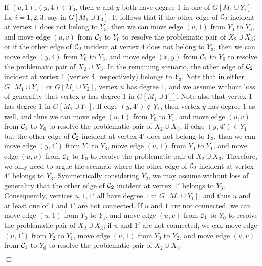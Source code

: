 \documentclass[11pt,twoside]{article}\usepackage{amssymb,latexsym,graphicx,hyperref}\usepackage{epstopdf}
\newenvironment{proof}{{\sc Proof. }}{\hfill$\Box$\vspace{0.2in}}
\begin{document}
\begin{proof}
If $(u, 1), (y, 4) \in Y_0$, then $u$ and $y$ both have degree $1$ in one of $G[M_1 \cup Y_i]$ for $i = 1, 2, 3$, say in $G[M_1 \cup Y_3]$.
It follows that if the other edge of ${\cal C}_2$ incident at vertex $1$ does not belong to $Y_3$,
then we can move edge $(u, 1)$ from $Y_0$ to $Y_3$, and move edge $(u, v)$ from ${\cal C}_1$ to $Y_0$ to resolve the problematic pair of $X_2 \cup X_3$;
or if the other edge of ${\cal C}_2$ incident at vertex $4$ does not belong to $Y_3$,
then we can move edge $(y, 4)$ from $Y_0$ to $Y_3$, and move edge $(x, y)$ from ${\cal C}_1$ to $Y_0$ to resolve the problematic pair of $X_2 \cup X_3$.
In the remaining scenario, the other edge of ${\cal C}_2$ incident at vertex $1$ (vertex $4$, respectively) belongs to $Y_3$.
Note that in either $G[M_1 \cup Y_1]$ or $G[M_1 \cup Y_2]$, vertex $u$ has degree $1$,
and we assume without loss of generality that vertex $u$ has degree $1$ in $G[M_1 \cup Y_1]$.
Note also that vertex $1$ has degree $1$ in $G[M_1 \cup Y_1]$.
If edge $(y, 4') \notin Y_1$, then vertex $y$ has degree $1$ as well, and thus
we can move edge $(u, 1)$ from $Y_0$ to $Y_1$, and move edge $(u, v)$ from ${\cal C}_1$ to $Y_0$ to resolve the problematic pair of $X_2 \cup X_3$;
if edge $(y, 4') \in Y_1$ but the other edge of ${\cal C}_2$ incident at vertex $4'$ does not belong to $Y_3$,
then we can move edge $(y, 4')$ from $Y_1$ to $Y_3$, move edge $(u, 1)$ from $Y_0$ to $Y_1$,
and move edge $(u, v)$ from ${\cal C}_1$ to $Y_0$ to resolve the problematic pair of $X_2 \cup X_3$.
Therefore, we only need to argue the scenario where the other edge of ${\cal C}_2$ incident at vertex $4'$ belongs to $Y_3$.
Symmetrically considering $Y_2$, we may assume without loss of generality that the other edge of ${\cal C}_2$ incident at vertex $1'$ belongs to $Y_3$.
Consequently, vertices $u, 1, 1'$ all have degree $1$ in $G[M_1 \cup Y_1]$, and thus $u$ and at least one of $1$ and $1'$ are not connected.
If $u$ and $1$ are not connected, we can move edge $(u, 1)$ from $Y_0$ to $Y_1$,
and move edge $(u, v)$ from ${\cal C}_1$ to $Y_0$ to resolve the problematic pair of $X_2 \cup X_3$;
if $u$ and $1'$ are not connected, we can move edge $(u, 1')$ from $Y_2$ to $Y_1$, move edge $(u, 1)$ from $Y_0$ to $Y_2$,
and move edge $(u, v)$ from ${\cal C}_1$ to $Y_0$ to resolve the problematic pair of $X_2 \cup X_3$.



\end{proof}
\end{document}
